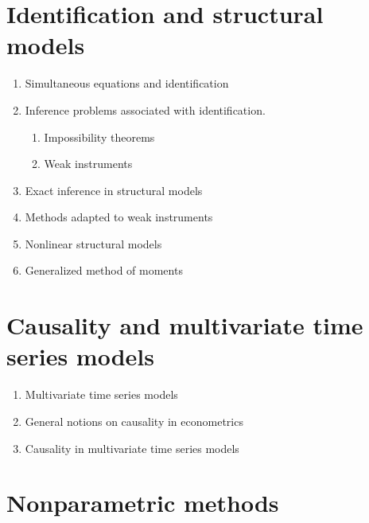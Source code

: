 \documentclass[titlepage,11pt,amstex]{article}
\begin{document}
\section{Identification and structural models \label{Identification and
structural models}}

\begin{enumerate}
\item Simultaneous equations and identification

\item Inference problems associated with identification.

\begin{enumerate}
\item Impossibility theorems

\item Weak instruments
\end{enumerate}

\item Exact inference in structural models

\item Methods adapted to weak instruments

\item Nonlinear structural models

\item Generalized method of moments
\end{enumerate}

\section{Causality and multivariate time series models \label{Causality and
multivariate time series models}}

\begin{enumerate}
\item \label{Multivariate time series models}Multivariate time series models

\item \label{Causality in econometrics}General notions on causality in
econometrics

\item \label{Causality in multivariate time series models}Causality in
multivariate time series models
\end{enumerate}

\section{Nonparametric methods \label{Nonparametric methods}}
\end{document}
